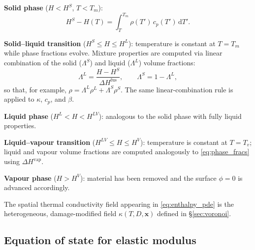 \documentclass[12pt, a4paper]{article}
\newcommand{\vv}[1]{\bm{#1}}
\begin{document}
\noindent\textbf{Solid phase} ($H < H^S$, $T < T_m$):
\begin{equation}
    H^S - H(T) = \int_{T}^{T_m} \rho(T')\,c_p(T')\,\mathrm{d}T'.
    \label{eq:H_solid}
\end{equation}

\noindent\textbf{Solid--liquid transition} ($H^S \le H \le H^L$):
temperature is constant at $T = T_m$ while phase fractions evolve.
Mixture properties are computed via linear combination of the
solid ($\Lambda^S$) and liquid ($\Lambda^L$) volume fractions:
\begin{equation}
    \Lambda^L = \frac{H - H^S}{\Delta H^\mathrm{fus}},
    \qquad
    \Lambda^S = 1 - \Lambda^L,
    \label{eq:phase_fracs}
\end{equation}
so that, for example, $\rho = \Lambda^L\rho^L + \Lambda^S\rho^S$.  The
same linear-combination rule is applied to $\kappa$, $c_p$, and $\beta$.

\noindent\textbf{Liquid phase} ($H^L < H < H^{LV}$): analogous to the solid
phase with fully liquid properties.

\noindent\textbf{Liquid--vapour transition} ($H^{LV} \le H \le H^V$):
temperature is constant at $T = T_v$; liquid and vapour volume fractions
are computed analogously to \cref{eq:phase_fracs} using $\Delta H^\mathrm{vap}$.

\noindent\textbf{Vapour phase} ($H > H^V$): material has been removed and the
surface $\phi = 0$ is advanced accordingly.

\noindent The spatial thermal conductivity field appearing in
\cref{eq:enthalpy_pde} is the heterogeneous, damage-modified field
$\kappa(T, D, \vv{x})$ defined in \S\ref{sec:voronoi}.

\subsection{Equation of state for elastic modulus}
\label{sec:eos}
\end{document}
